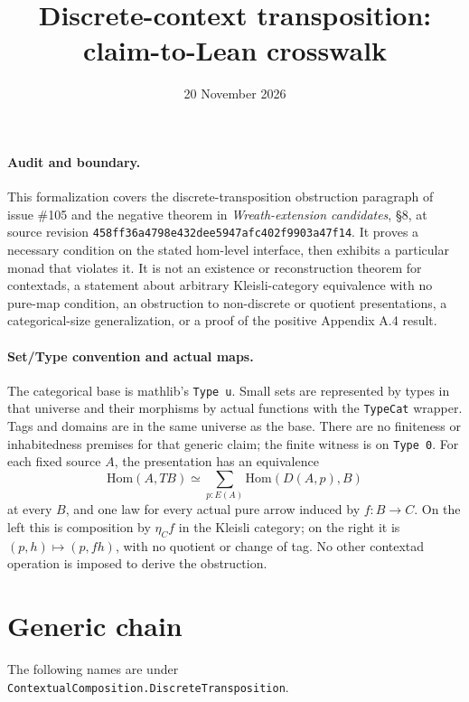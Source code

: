 \documentclass[11pt]{article}
\title{Discrete-context transposition: claim-to-Lean crosswalk}
\date{20 November 2026}
\begin{document}
\maketitle

\paragraph{Audit and boundary.}
This formalization covers the discrete-transposition obstruction paragraph of
issue \#105 and the negative theorem in \emph{Wreath-extension candidates},
\S 8, at source revision
\nolinkurl{458ff36a4798e432dee5947afc402f9903a47f14}.
It proves a necessary condition on the stated hom-level interface, then
exhibits a particular monad that violates it. It is not an existence or
reconstruction theorem for contextads, a statement about arbitrary
Kleisli-category equivalence with no pure-map condition, an obstruction to
non-discrete or quotient presentations, a categorical-size generalization,
or a proof of the positive Appendix A.4 result.

\paragraph{Set/Type convention and actual maps.}
The categorical base is mathlib's \texttt{Type u}. Small sets are represented
by types in that universe and their morphisms by actual functions with the
\texttt{TypeCat} wrapper. Tags and domains are in the same universe as the
base. There are no finiteness or inhabitedness premises for that generic
claim; the finite witness is on \texttt{Type 0}. For each fixed source
$A$, the presentation has an equivalence
\[
 \mathrm{Hom}(A,T B)\simeq \sum_{p:E(A)}\mathrm{Hom}(D(A,p),B)
\]
at every $B$, and one law for every actual pure arrow induced by $f:B\to C$.
On the left this is composition by $\eta_C f$ in the Kleisli category; on
the right it is $(p,h)\mapsto(p,f h)$, with no quotient or change of tag.
No other contextad operation is imposed to derive the obstruction.

\section*{Generic chain}
The following names are under
\nolinkurl{ContextualComposition.DiscreteTransposition}.
\end{document}
